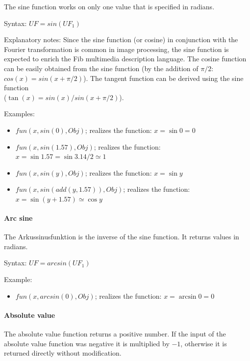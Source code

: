 The sine function works on only one value that is specified in radians.

\bigskip\noindent
Syntax:
$UF=sin(UF_1)$

\bigskip\noindent
Explanatory notes:
Since the sine function (or cosine) in conjunction with the Fourier transformation is common in image processing, the sine function is expected to enrich the Fib multimedia description language. The cosine function can be easily obtained from the sine function (by the addition of $\pi/2$: $cos{(x)}=sin{(x+\pi/2)}$). The tangent function can be derived using the sine function\\ ($\tan{(x)}=sin{(x)}/sin{(x+\pi/2)}$).

\bigskip\noindent
Examples:
\begin{itemize}
 \item $fun(x, sin(0), Obj)$; realizes the function: $x=\sin{0}=0$
 \item $fun(x, sin(1.57), Obj)$; realizes the function: $x=\sin{1.57}=\sin{3.14/2} \simeq 1$
 \item $fun(x, sin(y), Obj)$; realizes the function: $x=\sin{y}$
 \item $fun(x, sin( add(y, 1.57) ), Obj)$; realizes the function: $x=\sin{(y + 1.57 )} \simeq \cos{y}$
\end{itemize}


\paragraph{Arc sine}

The Arkussinusfunktion is the inverse of the sine function. It returns values in radians.

\bigskip\noindent
Syntax:
$UF=arcsin( UF_1 )$

\bigskip\noindent
Example:
\begin{itemize}
 \item $fun(x, arcsin(0), Obj)$; realizes the function: $x=\arcsin{0}=0$
\end{itemize}


\paragraph{Absolute value}

The absolute value function returns a positive number. If the input of the absolute value function was negative it is multiplied by $-1$, otherwise it is returned directly without modification.

